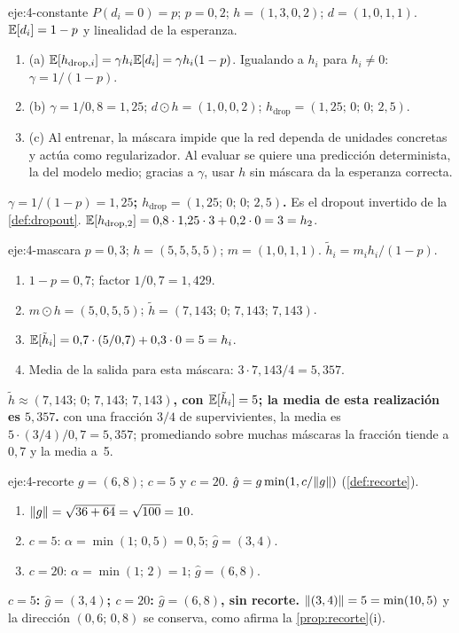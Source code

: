 \begin{solucion}{eje:4-constante}
\datos $P(d_i=0)=p$; $p=0{,}2$; $h=(1,3,0,2)$; $d=(1,0,1,1)$.
\planteamiento $\mathbb{E}[d_i]=1-p$ y linealidad de la esperanza.
\pasos
\begin{enumerate}[label=\arabic*.]
  \item (a) $\mathbb{E}[h_{\mathrm{drop},i}]=\gamma h_i\mathbb{E}[d_i]=\gamma h_i(1-p)$. Igualando a $h_i$ para $h_i\ne 0$: $\gamma=1/(1-p)$.
  \item (b) $\gamma=1/0{,}8=1{,}25$; $d\odot h=(1,0,0,2)$; $h_{\mathrm{drop}}=(1{,}25;\,0;\,0;\,2{,}5)$.
  \item (c) Al entrenar, la máscara impide que la red dependa de unidades concretas y actúa como regularizador. Al evaluar se quiere una predicción determinista, la del modelo medio; gracias a $\gamma$, usar $h$ sin máscara da la esperanza correcta.
\end{enumerate}
\resultado \textbf{$\gamma=1/(1-p)=1{,}25$; $h_{\mathrm{drop}}=(1{,}25;\,0;\,0;\,2{,}5)$.} Es el dropout invertido de la \cref{def:dropout}.
\comprobacion $\mathbb{E}[h_{\mathrm{drop},2}]=0{,}8\cdot 1{,}25\cdot 3+0{,}2\cdot 0=3=h_2$.
\end{solucion}

\begin{solucion}{eje:4-mascara}
\datos $p=0{,}3$; $h=(5,5,5,5)$; $m=(1,0,1,1)$.
\planteamiento $\tilde h_i=m_ih_i/(1-p)$.
\pasos
\begin{enumerate}[label=\arabic*.]
  \item $1-p=0{,}7$; factor $1/0{,}7=1{,}429$.
  \item $m\odot h=(5,0,5,5)$; $\tilde h=(7{,}143;\,0;\,7{,}143;\,7{,}143)$.
  \item $\mathbb{E}[\tilde h_i]=0{,}7\cdot(5/0{,}7)+0{,}3\cdot 0=5=h_i$.
  \item Media de la salida para esta máscara: $3\cdot 7{,}143/4=5{,}357$.
\end{enumerate}
\resultado \textbf{$\tilde h\approx(7{,}143;\,0;\,7{,}143;\,7{,}143)$, con $\mathbb{E}[\tilde h_i]=5$; la media de esta realización es $5{,}357$.}
\comprobacion con una fracción $3/4$ de supervivientes, la media es $5\cdot(3/4)/0{,}7=5{,}357$; promediando sobre muchas máscaras la fracción tiende a $0{,}7$ y la media a~5.
\end{solucion}

\begin{solucion}{eje:4-recorte}
\datos $g=(6,8)$; $c=5$ y $c=20$.
\planteamiento $\hat g=g\min(1,c/\lVert g\rVert)$ (\cref{def:recorte}).
\pasos
\begin{enumerate}[label=\arabic*.]
  \item $\lVert g\rVert=\sqrt{36+64}=\sqrt{100}=10$.
  \item $c=5$: $\alpha=\min(1;\,0{,}5)=0{,}5$; $\hat g=(3,4)$.
  \item $c=20$: $\alpha=\min(1;\,2)=1$; $\hat g=(6,8)$.
\end{enumerate}
\resultado \textbf{$c=5$: $\hat g=(3,4)$; $c=20$: $\hat g=(6,8)$, sin recorte.}
\comprobacion $\lVert(3,4)\rVert=5=\min(10,5)$ y la dirección $(0{,}6;\,0{,}8)$ se conserva, como afirma la \cref{prop:recorte}(i).
\end{solucion}

